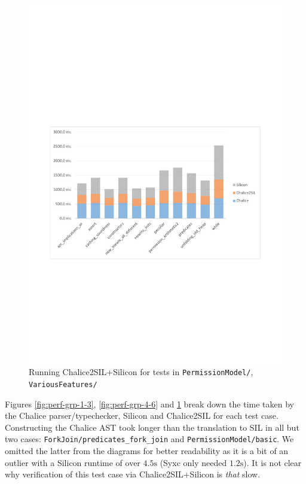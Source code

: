 \begin{figure}
\includegraphics[width=145mm]{src/data/groups-7-8.pdf}
\caption{Running Chalice2SIL+Silicon for tests in \texttt{PermissionModel/}, \texttt{VariousFeatures/}}\label{fig:perf-grp-7-8}
\end{figure}

Figures \ref{fig:perf-grp-1-3}, \ref{fig:perf-grp-4-6} and \ref{fig:perf-grp-7-8} break down the time taken by the Chalice parser/typechecker, Silicon and Chalice2SIL for each test case. 
Constructing the Chalice AST took longer than the translation to SIL in all but two cases: \texttt{ForkJoin/predicates_fork_join} and  \texttt{PermissionModel/basic}.
We omitted the latter from the diagrams for better readability as it is a bit of an outlier with a Silicon runtime of over $4.5\text{s}$ (Syxc only needed $1.2\text{s}$).
It is not clear why verification of this test case via Chalice2SIL+Silicon is \emph{that} slow. 

